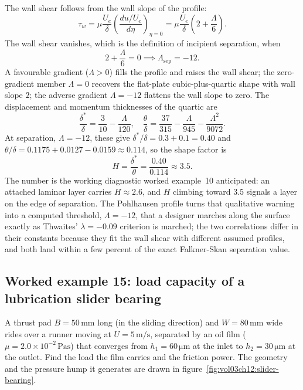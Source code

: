 The wall shear follows from the wall slope of the profile:
\[
\tau_w = \mu\frac{U_e}{\delta}\left(\frac{du/U_e}{d\eta}\right)_{
\eta=0} = \mu\frac{U_e}{\delta}\left(2 + \frac{\Lambda}{6}\right).
\]
The wall shear vanishes, which is the definition of incipient
separation, when
\[
2 + \frac{\Lambda}{6} = 0 \implies \Lambda_{\text{sep}} = -12.
\]
A favourable gradient ($\Lambda > 0$) fills the profile and raises
the wall shear; the zero-gradient member $\Lambda = 0$ recovers the
flat-plate cubic-plus-quartic shape with wall slope $2$; the adverse
gradient $\Lambda = -12$ flattens the wall slope to zero. The
displacement and momentum thicknesses of the quartic are
\[
\frac{\delta^*}{\delta} = \frac{3}{10} - \frac{\Lambda}{120},
\quad
\frac{\theta}{\delta} = \frac{37}{315} - \frac{\Lambda}{945} -
\frac{\Lambda^2}{9072}.
\]
At separation, $\Lambda = -12$, these give $\delta^*/\delta =
0.3 + 0.1 = 0.40$ and $\theta/\delta = 0.1175 + 0.0127 - 0.0159
\approx 0.114$, so the shape factor is
\[
H = \frac{\delta^*}{\theta} = \frac{0.40}{0.114} \approx 3.5.
\]
The number is the working diagnostic worked example~10 anticipated:
an attached laminar layer carries $H\approx2.6$, and $H$ climbing
toward $3.5$ signals a layer on the edge of separation. The
Pohlhausen profile turns that qualitative warning into a computed
threshold, $\Lambda = -12$, that a designer marches along the
surface exactly as Thwaites' $\lambda = -0.09$ criterion is
marched; the two correlations differ in their constants because
they fit the wall shear with different assumed profiles, and both
land within a few percent of the exact Falkner-Skan separation
value.

\subsection*{Worked example 15: load capacity of a lubrication slider bearing}

A thrust pad $B = 50\,\si{\milli\meter}$ long (in the sliding
direction) and $W = 80\,\si{\milli\meter}$ wide rides over a runner
moving at $U = 5\,\si{\meter\per\second}$, separated by an oil film
($\mu = 2.0\times10^{-2}\,\si{\pascal\second}$) that converges from
$h_1 = 60\,\si{\micro\meter}$ at the inlet to $h_2 = 30\,\si{\micro
\meter}$ at the outlet. Find the load the film carries and the
friction power. The geometry and the pressure hump it generates are
drawn in figure~\ref{fig:vol03ch12:slider-bearing}.

